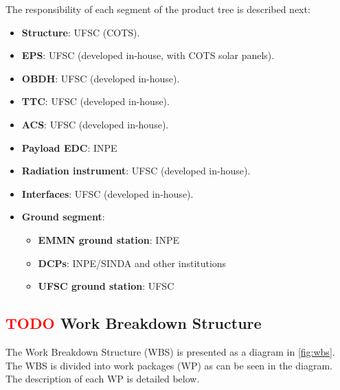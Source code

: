 The responsibility of each segment of the product tree is described next:

\begin{itemize}
    \item \textbf{Structure}: UFSC (COTS).
    \item \textbf{EPS}: UFSC (developed in-house, with COTS solar panels).
    \item \textbf{OBDH}: UFSC (developed in-house).
    \item \textbf{TTC}: UFSC (developed in-house).
    \item \textbf{ACS}: UFSC (developed in-house).
    \item \textbf{Payload EDC}: INPE
    \item \textbf{Radiation instrument}: UFSC (developed in-house).
    \item \textbf{Interfaces}: UFSC (developed in-house).
    \item \textbf{Ground segment}:
    \begin{itemize}
        \item \textbf{EMMN ground station}: INPE
        \item \textbf{DCPs}: INPE/SINDA and other institutions
        \item \textbf{UFSC ground station}: UFSC
    \end{itemize}
\end{itemize}

\subsection{ \textcolor{red}{TODO} Work Breakdown Structure}

The Work Breakdown Structure (WBS) is presented as a diagram in \autoref{fig:wbs}. The WBS is divided into work packages (WP) as can be seen in the diagram. The description of each WP is detailed below.

